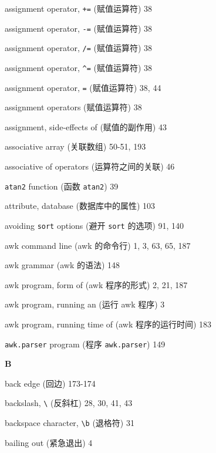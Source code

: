 \begin{multicols}{2}
\hangindent=2pc  assignment operator, \verb'+=' (赋值运算符) 38

\hangindent=2pc  assignment operator, \verb'-=' (赋值运算符) 38

\hangindent=2pc  assignment operator, \verb'/=' (赋值运算符) 38

\hangindent=2pc  assignment operator, \verb'^=' (赋值运算符) 38

\hangindent=2pc  assignment operator, \verb'=' (赋值运算符) 38, 44

\hangindent=2pc  assignment operators (赋值运算符) 38

\hangindent=2pc  assignment, side-effects of (赋值的副作用) 43

\hangindent=2pc  associative array (关联数组) 50-51, 193

\hangindent=2pc  associative of operators (运算符之间的关联) 46

\hangindent=2pc  \verb'atan2' function (函数 \verb'atan2') 39

\hangindent=2pc  attribute, database (数据库中的属性) 103

\hangindent=2pc  avoiding \verb'sort' options (避开 \verb'sort'
的选项) 91, 140

\hangindent=2pc  awk command line (awk 的命令行) 1, 3, 63, 65, 187

\hangindent=2pc  awk grammar (awk 的语法) 148

\hangindent=2pc  awk program, form of (awk 程序的形式) 2, 21, 187

\hangindent=2pc  awk program, running an (运行 awk 程序) 3

\hangindent=2pc  awk program, running time of (awk
程序的运行时间) 183

\hangindent=2pc  \verb'awk.parser' program (程序
\verb'awk.parser') 149

\medskip\textbf{\large{B}}

\hangindent=2pc  back edge (回边) 173-174

\hangindent=2pc  backslash, \verb'\' (反斜杠) 28, 30, 41, 43

\hangindent=2pc  backspace character, \verb'\b' (退格符) 31

\hangindent=2pc  bailing out (紧急退出) 4


\end{multicols}
